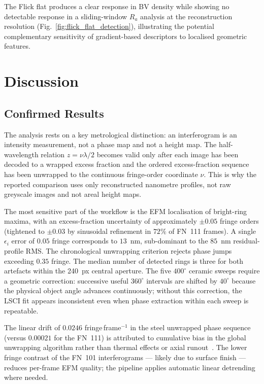 \documentclass[review]{elsarticle}
\begin{document}
The Flick flat produces a clear response in BV density while showing no detectable response in a sliding-window $R_a$ analysis at the reconstruction resolution (Fig.~\ref{fig:flick_flat_detection}), illustrating the potential complementary sensitivity of gradient-based descriptors to localised geometric features.

\FloatBarrier
\section{Discussion}

\subsection{Confirmed Results}
The analysis rests on a key metrological distinction: an interferogram is an intensity measurement, not a phase map and not a height map. The half-wavelength relation $z=\nu\lambda/2$ becomes valid only after each image has been decoded to a wrapped excess fraction and the ordered excess-fraction sequence has been unwrapped to the continuous fringe-order coordinate $\nu$. This is why the reported comparison uses only reconstructed nanometre profiles, not raw greyscale images and not areal height maps.

The most sensitive part of the workflow is the EFM localisation of bright-ring maxima, with an excess-fraction uncertainty of approximately $\pm 0.05$ fringe orders (tightened to $\pm 0.03$ by sinusoidal refinement in $72\%$ of FN~111 frames). A single $\epsilon_i$ error of $0.05$ fringe corresponds to $13$~nm, sub-dominant to the $85$~nm residual-profile RMS. The chronological unwrapping criterion rejects phase jumps exceeding $0.35$ fringe. The median number of detected rings is three for both artefacts within the 240~px central aperture. The five $400^\circ$ ceramic sweeps require a geometric correction: successive useful $360^\circ$ intervals are shifted by $40^\circ$ because the physical object angle advances continuously; without this correction, the LSCI fit appears inconsistent even when phase extraction within each sweep is repeatable.

The linear drift of $0.0246$ fringe\,frame$^{-1}$ in the steel unwrapped phase sequence (versus $0.00021$ for the FN~111) is attributed to cumulative bias in the global unwrapping algorithm rather than thermal effects or axial runout~\cite{NewportCorporation:2018vk}.\label{sec:discussion_drift} The lower fringe contrast of the FN~101 interferograms — likely due to surface finish — reduces per-frame EFM quality; the pipeline applies automatic linear detrending where needed.
\end{document}

